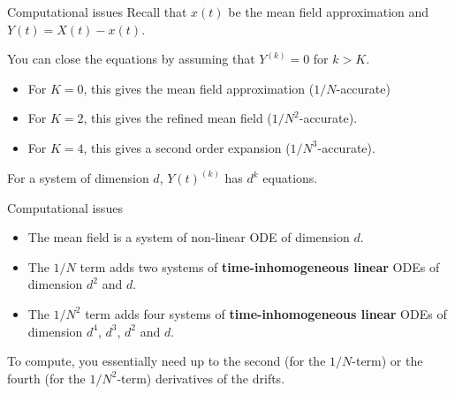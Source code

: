 \documentclass{beamer}
\newcommand\dt{\frac{d}{dt}}
\newcommand\esp[1]{\mathbb{E}\left[#1\right]}
\begin{document}
  

\begin{frame}{Computational issues}
  Recall that $x(t)$ be the mean field approximation and $Y(t)=X(t)-x(t)$.
  \begin{exampleblock}{}
    You can close the equations by assuming that $Y^{(k)}=0$ for
    $k> K$.
    \begin{itemize}
    \item For $K=0$, this gives the mean field approximation
      ($1/N$-accurate)
    \item For $K=2$, this gives the refined mean field
      ($1/N^2$-accurate). 
    \item For $K=4$, this gives a second order expansion
      ($1/N^3$-accurate).
    \end{itemize}
  \end{exampleblock}
  For a system of dimension $d$, $Y(t)^{(k)}$ has $d^k$ equations.
\end{frame}

\begin{frame}{Computational issues}
  \begin{itemize}
  \item The mean field is a system of non-linear ODE of dimension
    $d$. 
  \item The $1/N$ term adds two systems of \textbf{time-inhomogeneous
      linear} ODEs of dimension $d^2$ and $d$.
  \item The $1/N^2$ term adds four systems of
    \textbf{time-inhomogeneous linear} ODEs of dimension $d^4$, $d^3$,
    $d^2$ and $d$.
  \end{itemize}
  \bigskip
  
  To compute, you essentially need up to the second (for the
  $1/N$-term) or the fourth (for the $1/N^2$-term) derivatives of the
  drifts. 
\end{frame}
\end{document}

